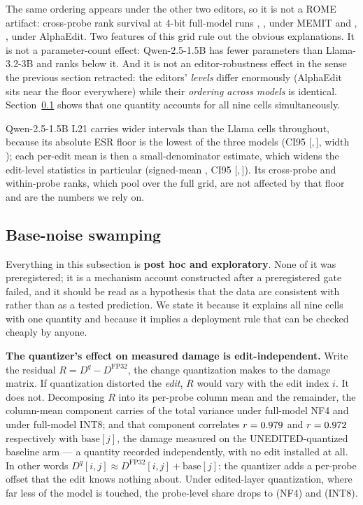 \documentclass[preprint,12pt]{elsarticle}
\begin{document}
The same ordering appears under the other two editors, so it is not a ROME artifact:
cross-probe rank survival at 4-bit full-model runs \pFlatNfFMLOneMemit{},
\pFlatNfFMLThreeMemit{}, \pFlatNfFMQOneMemit{} under MEMIT and \pFlatNfFMLOneAlpha{},
\pFlatNfFMLThreeAlpha{}, \pFlatNfFMQOneAlpha{} under AlphaEdit. Two features of this
grid rule out the obvious explanations. It is not a parameter-count effect:
Qwen-2.5-1.5B has fewer parameters than Llama-3.2-3B and ranks below it. And it is not
an editor-robustness effect in the sense the previous section retracted: the editors'
\emph{levels} differ enormously (AlphaEdit sits near the floor everywhere) while their
\emph{ordering across models} is identical. Section~\ref{sec:swamping} shows that one
quantity accounts for all nine cells simultaneously.

Qwen-2.5-1.5B L21 carries wider intervals than the Llama cells throughout, because its
absolute ESR floor is the lowest of the three models (CI95
[\pQwenFNFMAbsEsrLo{},\,\pQwenFNFMAbsEsrHi{}], width \pQwenAbsEsrWidth{}); each per-edit
mean is then a small-denominator estimate, which widens the edit-level statistics in
particular (signed-mean \pQwenFNFMSignPt{}, CI95
[\pQwenFNFMSignLo{},\,\pQwenFNFMSignHi{}]). Its cross-probe and within-probe ranks,
which pool over the full grid, are not affected by that floor and are the numbers we
rely on.

\subsection{Base-noise swamping}
\label{sec:swamping}

Everything in this subsection is \textbf{post hoc and exploratory}. None of it was
preregistered; it is a mechanism account constructed after a preregistered gate failed,
and it should be read as a hypothesis that the data are consistent with rather than as a
tested prediction. We state it because it explains all nine cells with one quantity and
because it implies a deployment rule that can be checked cheaply by anyone.

\textbf{The quantizer's effect on measured damage is edit-independent.} Write the
residual $R = D^{q} - D^{\mathrm{FP32}}$, the change quantization makes to the damage
matrix. If quantization distorted the \emph{edit}, $R$ would vary with the edit index
$i$. It does not. Decomposing $R$ into its per-probe column mean and the remainder,
the column-mean component carries \pAddShareNfFM{} of the total variance under
full-model NF4 and \pAddShareIntFM{} under full-model INT8; and that component
correlates $r=0.979{}$ and $r=0.972{}$ respectively with
$\mathrm{base}[j]$, the damage measured on the UNEDITED-quantized baseline arm --- a
quantity recorded independently, with no edit installed at all. In other words
$D^{q}[i,j] \approx D^{\mathrm{FP32}}[i,j] + \mathrm{base}[j]$: the quantizer adds a
per-probe offset that the edit knows nothing about. Under edited-layer quantization,
where far less of the model is touched, the probe-level share drops to
\pAddShareNfEL{} (NF4) and \pAddShareIntEL{} (INT8).
\end{document}
